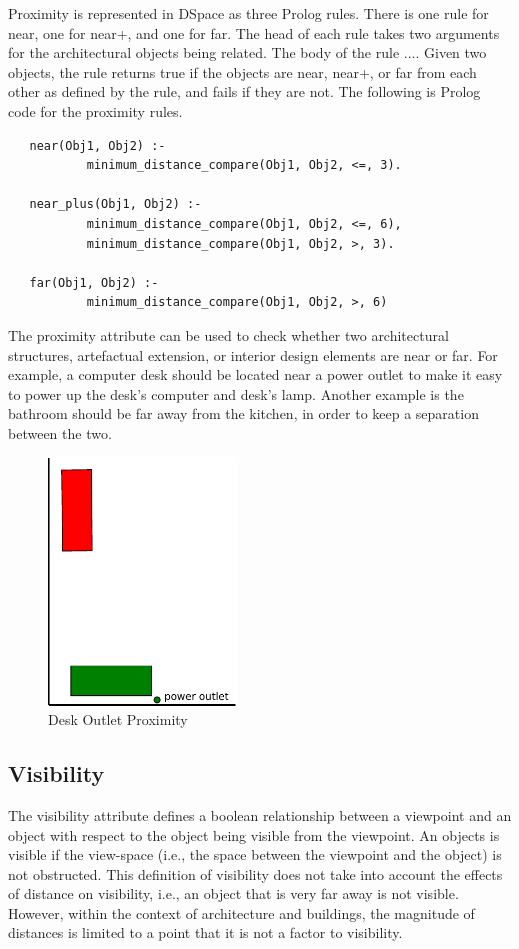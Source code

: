 \documentclass[12pt]{ucthesis}
\begin{document}
Proximity is represented in DSpace as three Prolog rules. There is one rule for near, one for near+, and one for far. The head of each rule takes two arguments for the architectural objects being related. The body of the rule .... Given two objects, the rule returns true if the objects are near, near+, or far from each other as defined by the rule, and fails if they are not. The following is Prolog code for the proximity rules.

\begin{verbatim}
   near(Obj1, Obj2) :- 
           minimum_distance_compare(Obj1, Obj2, <=, 3).
   
   near_plus(Obj1, Obj2) :-
           minimum_distance_compare(Obj1, Obj2, <=, 6),
           minimum_distance_compare(Obj1, Obj2, >, 3).   
   
   far(Obj1, Obj2) :- 
           minimum_distance_compare(Obj1, Obj2, >, 6)

\end{verbatim}

The proximity attribute can be used to check whether two architectural structures, artefactual extension, or interior design elements are near or far. For example, a computer desk should be located near a power outlet to make it easy to power up the desk's computer and desk's lamp. Another example is the bathroom should be far away from the kitchen, in order to keep a separation between the two.

\begin{figure}[H]
 \centering
 \includegraphics[width=50mm]{desk-proximity}
 \caption{Desk Outlet Proximity}
\label{desk-proximity}
\end{figure}

\subsection{Visibility}
The visibility attribute defines a boolean relationship between a viewpoint and an object with respect to the object being visible from the viewpoint. An objects is visible if the view-space (i.e., the space between the viewpoint and the object) is not obstructed. This definition of visibility does not take into account the effects of distance on visibility, i.e., an object that is very far away is not visible. However, within the context of architecture and buildings, the magnitude of distances is limited to a point that it is not a factor to visibility.
\end{document}
